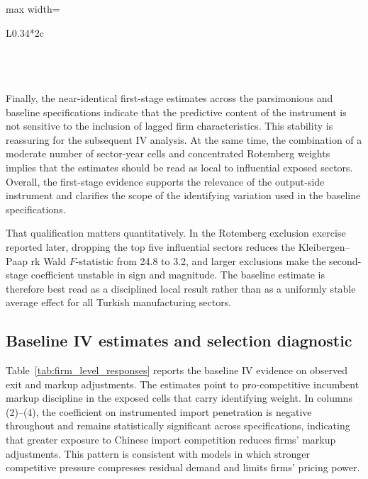 ﻿\documentclass[12pt]{article}
\newenvironment{fittabular}[1]{\begin{adjustbox}{max width=\textwidth}\begin{tabular}{#1}}{\end{tabular}\end{adjustbox}}
\begin{document}
\begin{table}[H]
\begin{fittabular}{L{0.34\textwidth}*{2}{c}}
\hline\hline
{}\\
\\
\\
\\
\end{fittabular}
\end{table}

Finally, the near-identical first-stage estimates across the parsimonious and baseline specifications indicate that the predictive content of the instrument is not sensitive to the inclusion of lagged firm characteristics. This stability is reassuring for the subsequent IV analysis. At the same time, the combination of a moderate number of sector-year cells and concentrated Rotemberg weights implies that the estimates should be read as local to influential exposed sectors. Overall, the first-stage evidence supports the relevance of the output-side instrument and clarifies the scope of the identifying variation used in the baseline specifications.

That qualification matters quantitatively. In the Rotemberg exclusion exercise reported later, dropping the top five influential sectors reduces the Kleibergen--Paap rk Wald \(F\)-statistic from 24.8 to 3.2, and larger exclusions make the second-stage coefficient unstable in sign and magnitude. The baseline estimate is therefore best read as a disciplined local result rather than as a uniformly stable average effect for all Turkish manufacturing sectors.

\subsection{Baseline IV estimates and selection diagnostic}
    
Table~\ref{tab:firm_level_responses} reports the baseline IV evidence on observed exit and markup adjustments. The estimates point to pro-competitive incumbent markup discipline in the exposed cells that carry identifying weight. In columns (2)--(4), the coefficient on instrumented import penetration is negative throughout and remains statistically significant across specifications, indicating that greater exposure to Chinese import competition reduces firms' markup adjustments. This pattern is consistent with models in which stronger competitive pressure compresses residual demand and limits firms' pricing power.
\end{document}

